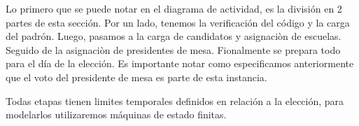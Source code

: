 Lo primero que se puede notar en el diagrama de actividad, es la división en 2 partes de esta sección. Por un lado, tenemos la verificación del código y la carga del padrón. Luego, pasamos a la carga de candidatos y asignaciòn de escuelas. Seguido de la asignaciòn de presidentes de mesa. Fionalmente se prepara todo para el día de la elección. Es importante notar como especificamos anteriormente que el voto del presidente de mesa es parte de esta instancia. 

Todas etapas tienen limites temporales definidos en relación a la elección, para modelarlos utilizaremos máquinas de estado finitas.

